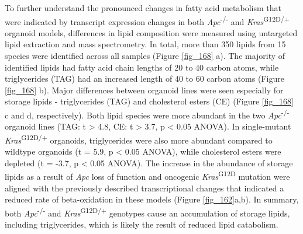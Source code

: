 \begin{flushleft}
To further understand the pronounced changes in fatty acid metabolism that were indicated by transcript expression changes in both \textit{Apc}\textsuperscript{-/-}  and \textit{Kras}\textsuperscript{G12D/+} organoid models, differences in lipid composition were measured using untargeted lipid extraction and mass spectrometry. In total, more than 350 lipids from 15 species were identified across all samples (Figure \ref{fig_168} a). The majority of identified lipids had fatty acid chain lengths of 20 to 40 carbon atoms, while triglycerides (TAG) had an increased length of 40 to 60 carbon atoms (Figure \ref{fig_168} b). Major differences between organoid lines were seen especially for storage lipids - triglycerides (TAG) and cholesterol esters (CE) (Figure \ref{fig_168} c and d, respectively). Both lipid species were more abundant in the two \textit{Apc}\textsuperscript{-/-}  organoid lines (TAG: t > 4.8, CE: t > 3.7, p < 0.05 ANOVA). In single-mutant \textit{Kras}\textsuperscript{G12D/+} organoids, triglycerides were also more abundant compared to wildtype organoids (t = 5.9, p < 0.05 ANOVA), while cholesterol esters were depleted (t = -3.7, p < 0.05 ANOVA). The increase in the abundance of storage lipids as a result of \textit{Apc} loss of function and oncogenic \textit{Kras}\textsuperscript{G12D} mutation were aligned with the previously described transcriptional changes that indicated a reduced rate of beta-oxidation in these models (Figure \ref{fig_162}a,b). In summary, both \textit{Apc}\textsuperscript{-/-}  and \textit{Kras}\textsuperscript{G12D/+} genotypes cause an accumulation of storage lipids, including triglycerides, which is likely the result of reduced lipid catabolism. 


\end{flushleft}
